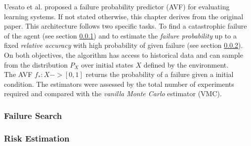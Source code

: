 Uesato et al. \cite{uesato18} proposed a failure probability predictor (AVF) for evaluating learning systems. If not stated otherwise, this chapter derives from the original paper. This architecture follows two specific tasks. To find a catastrophic failure of the agent (see section \ref{failure}) and to estimate the \textit{failure probability} up to a fixed \textit{relative accuracy} with high probability of given failure (see section \ref{risk}).\\
On both objectives, the algorithm has access to historical data and can sample from the distribution $P_X$ over initial states $X$ defined by the environment.\\
The AVF $f_*:X->[0,1]$ returns the probability of a failure given a initial condition. The estimators were assessed by the total number of experiments required and compared with 
the \textit{vanilla Monte Carlo} estimator (VMC).

\subsubsection{Failure Search}
\label{failure}


\subsubsection{Risk Estimation}
\label{risk}
